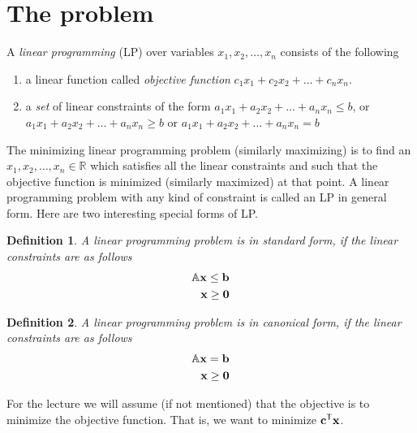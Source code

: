 \documentclass[12pt,
    driverfallback=dvipdfm,
 	openany,
    a4paper,
    toc=bibliography,
    twoside,
    numbers=noenddot]{book}              %
\newtheorem{definition}{Definition}[chapter]
\newcommand{\Reals}{\mathbb{R}}
\begin{document}
\section{The problem}
A \emph{linear programming} (LP) over variables $x_1,x_2,\dots,x_n$ consists of the following
\begin{enumerate}
\item a linear function called \emph{objective function} $c_1 x_1 + c_2 x_2 + \dots + c_n x_n$.
\item a \emph{set} of linear constraints of the form $a_1 x_1 + a_2 x_2 + \dots + a_n x_n \leq b$, or $a_1 x_1 + a_2 x_2 + \dots + a_n x_n \geq b$ or $a_1 x_1 + a_2 x_2 + \dots + a_n x_n = b$
\end{enumerate}
The minimizing linear programming problem (similarly maximizing) is to find an $x_1, x_2,\dots, x_n \in \Reals$ which satisfies all the linear constraints and such that the objective function is minimized (similarly maximized) at that point. A linear programming problem with any kind of constraint is called an LP in general form. Here are two interesting special forms of LP.

\begin{definition}
A linear programming problem is in \emph{standard form}, if the linear constraints are as follows
\begin{align*}
{\mathbb A} \mathbf x \leq \mathbf b \\
\mathbf x \geq \mathbf 0
\end{align*}
\end{definition}

\begin{definition}
A linear programming problem is in \emph{canonical form}, if the linear constraints are as follows
\begin{align*}
{\mathbb A} \mathbf x = \mathbf b \\
\mathbf x \geq \mathbf 0
\end{align*}
\end{definition}

\noindent For the lecture we will assume (if not mentioned) that the objective is to minimize the objective function. That is, we want to minimize ${\mathbf c}^{\mathsf{T}} \mathbf x$.
\end{document}
